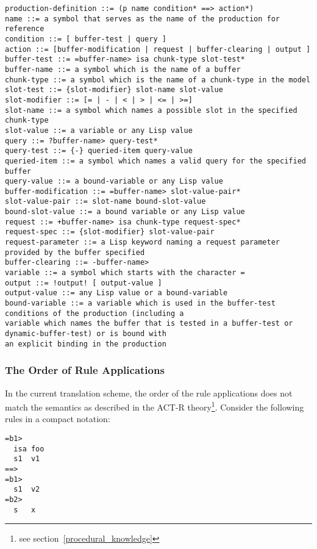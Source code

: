 \begin{lstlisting}[caption={The ACT-R production rule grammar}, label=lst:production_rule_grammar]
production-definition ::= (p name condition* ==> action*)
name ::= a symbol that serves as the name of the production for reference
condition ::= [ buffer-test | query ]
action ::= [buffer-modification | request | buffer-clearing | output ]
buffer-test ::= =buffer-name> isa chunk-type slot-test*
buffer-name ::= a symbol which is the name of a buffer
chunk-type ::= a symbol which is the name of a chunk-type in the model
slot-test ::= {slot-modifier} slot-name slot-value
slot-modifier ::= [= | - | < | > | <= | >=]
slot-name ::= a symbol which names a possible slot in the specified chunk-type
slot-value ::= a variable or any Lisp value
query ::= ?buffer-name> query-test*
query-test ::= {-} queried-item query-value
queried-item ::= a symbol which names a valid query for the specified buffer
query-value ::= a bound-variable or any Lisp value
buffer-modification ::= =buffer-name> slot-value-pair*
slot-value-pair ::= slot-name bound-slot-value
bound-slot-value ::= a bound variable or any Lisp value
request ::= +buffer-name> isa chunk-type request-spec*
request-spec ::= {slot-modifier} slot-value-pair
request-parameter ::= a Lisp keyword naming a request parameter provided by the buffer specified
buffer-clearing ::= -buffer-name>
variable ::= a symbol which starts with the character =
output ::= !output! [ output-value ]
output-value ::= any Lisp value or a bound-variable
bound-variable ::= a variable which is used in the buffer-test conditions of the production (including a
variable which names the buffer that is tested in a buffer-test or dynamic-buffer-test) or is bound with
an explicit binding in the production
\end{lstlisting}

\subsubsection{The Order of Rule Applications}
\label{implementation:rule_application_order}

In the current translation scheme, the order of the rule applications does not match the semantics as described in the ACT-R theory\footnote{see section~\ref{procedural_knowledge}}. Consider the following rules in a compact notation:

\begin{lstlisting}
=b1>
  isa foo
  s1  v1
==>
=b1>
  s1  v2
=b2>
  s   x
\end{lstlisting}

